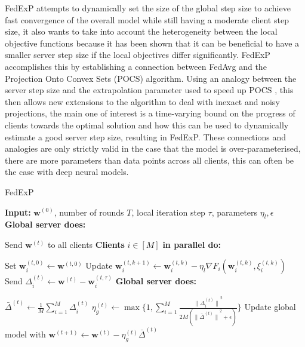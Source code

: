 \documentclass{article}
\newlength\myindent
\newcommand\bindent{%
  \begingroup
  \setlength{\itemindent}{\myindent}
  \addtolength{\algorithmicindent}{\myindent}
}
\newcommand\eindent{\endgroup}
\begin{document}
FedExP attempts to dynamically set the size of the global step size to achieve fast convergence of the overall model while still having a moderate client step size, it also wants to take into account the heterogeneity between the local objective functions because it has been shown that it can be beneficial to have a smaller server step size if the local objectives differ significantly. \cite{smallServerStepSizeForHetrogeneity}  FedExP accomplishes this by establishing a connection between FedAvg and the Projection Onto Convex Sets (POCS) algorithm.  Using an analogy between the server step size and the extrapolation parameter used to speed up POCS \cite{ExtrapolatedPOCS}, this then allows new extensions to the algorithm to deal with inexact and noisy projections, the main one of interest is a time-varying bound on the progress of clients towards the optimal solution and how this can be used to dynamically estimate a good server step size, resulting in FedExP.  These connections and analogies are only strictly valid in the case that the model is over-parameterised, there are more parameters than data points across all clients, this can often be the case with deep neural models.

\begin{algorithm}
\caption{FedExP}
\begin{algorithmic} 
\STATE \textbf{Input:} $\textbf{w}^{(0)}$, number of rounds $T$, local iteration step $\tau$, parameters $\eta_l, \epsilon$\\
    \STATE \textbf{Global server does:}
    \bindent
    \STATE Send $\textbf{w}^{(t)}$ to all clients
    \eindent
    \STATE \textbf{Clients} $i \in [M]$ \textbf{in parallel do:}
    \bindent
    \STATE Set $\textbf{w}_i^{(t,0)} \leftarrow \textbf{w}^{(t,0)}$    
            \STATE Update $\textbf{w}_i^{(t,k+1)} \leftarrow \textbf{w}_i^{(t,k)} - \eta_l \nabla F_i (\textbf{w}_i^{(t,k)}, \xi_i^{(t,k)})$
        \ENDFOR
        \STATE Send $\Delta_i^{(t)} \leftarrow \textbf{w}^{(t)} - \textbf{w}_i^{(t,\tau)}$
    \eindent
    \STATE \textbf{Global server does:}
    \bindent
    \STATE $\bar{\Delta}^{(t)} \leftarrow \frac{1}{M} \sum_{i=1}^{M}{\Delta_i^{(t)}}$
    \STATE $\eta_g^{(t)} \leftarrow \max\{1, \sum_{i=1}^{M}{\frac{{\lVert\Delta_i^{(t)}\rVert}^2}{2M({\lVert\bar{\Delta}^{(t)}\rVert}^{2} + \epsilon)}}\}$
    \STATE Update global model with $\textbf{w}^{(t+1)} \leftarrow \textbf{w}^{(t)} - \eta_g^{(t)}\bar{\Delta}^{(t)}$
    \eindent
\ENDFOR
\end{algorithmic}

\end{algorithm}
\end{document}
